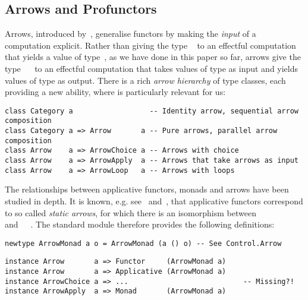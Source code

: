 \subsection{Arrows and Profunctors}\label{sec-arrows}

Arrows, introduced by~\citet{hughes2000arrows}, generalise functors by making
the \emph{input} of a computation explicit. Rather than giving the type
~ to an effectful computation that yields a value of type~, as
we have done in this paper so far, arrows give the type ~~ to
an effectful computation that takes values of type  as input and yields
values of type  as output. There is a rich \emph{arrow hierarchy} of type
classes, each providing a new ability, where  is particularly
relevant for us:

\vspace{0.5mm}
\begin{verbatim}
class Category a                  -- Identity arrow, sequential arrow composition
class Category a => Arrow       a -- Pure arrows, parallel arrow composition
class Arrow    a => ArrowChoice a -- Arrows with choice
class Arrow    a => ArrowApply  a -- Arrows that take arrows as input
class Arrow    a => ArrowLoop   a -- Arrows with loops
\end{verbatim}
\vspace{0.5mm}

\noindent
The relationships between applicative functors, monads and arrows have been
studied in depth. It is known, e.g. see~\citet{lindley2011idioms}
and~\citet{rivas2017notions}, that applicative functors correspond to so called
\emph{static arrows}, for which there is an isomorphism between
~\hs{()}~\hs{(}~\hs{->}~ and~~~. The
standard module  therefore provides the following
definitions:

\vspace{0.5mm}
\begin{verbatim}
newtype ArrowMonad a o = ArrowMonad (a () o) -- See Control.Arrow
\end{verbatim}
\vspace{0mm}
\begin{verbatim}
instance Arrow       a => Functor     (ArrowMonad a)
instance Arrow       a => Applicative (ArrowMonad a)
instance ArrowChoice a => ...                           -- Missing?!
instance ArrowApply  a => Monad       (ArrowMonad a)
\end{verbatim}
\vspace{0.5mm}

